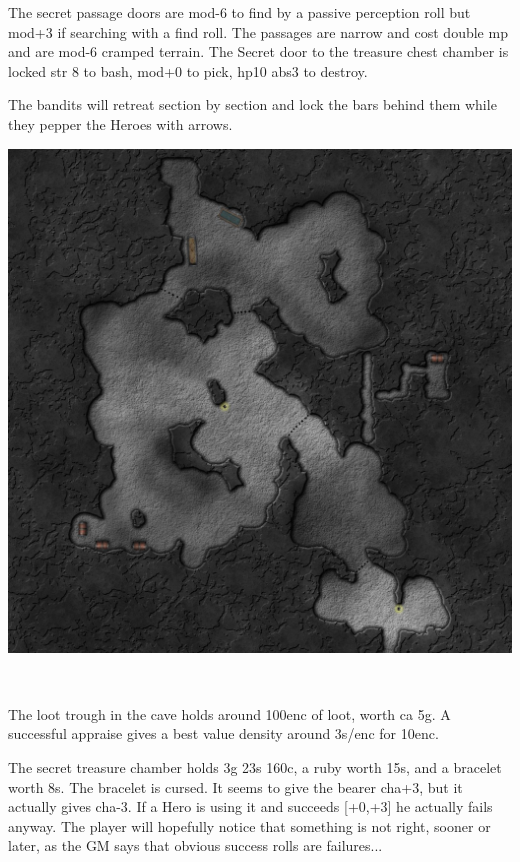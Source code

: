 The secret passage doors are mod-6 to find by a passive perception roll but mod+3 if searching with a find roll. The passages are narrow and cost double mp and are mod-6 cramped terrain. The Secret door to the treasure chest chamber is locked str 8 to bash, mod+0 to pick, hp10 abs3 to destroy.

The bandits will retreat section by section and lock the bars behind them while they pepper the Heroes with arrows.

\begin{center}
\includegraphics[width=1.0\linewidth]{./maps/Eisenkrafs-Bandits-Cave-(32+0+0).jpg}
\end{center}

\


The loot trough in the cave holds around 100enc of loot, worth ca 5g. A successful appraise gives a best value density around 3s/enc for 10enc.

The secret treasure chamber holds 3g 23s 160c, a ruby worth 15s, and a bracelet worth 8s. The bracelet is cursed. It seems to give the bearer cha+3, but it actually gives cha-3. If a Hero is using it and succeeds [+0,+3] he actually fails anyway. The player will hopefully notice that something is not right, sooner or later, as the GM says that obvious success rolls are failures...



